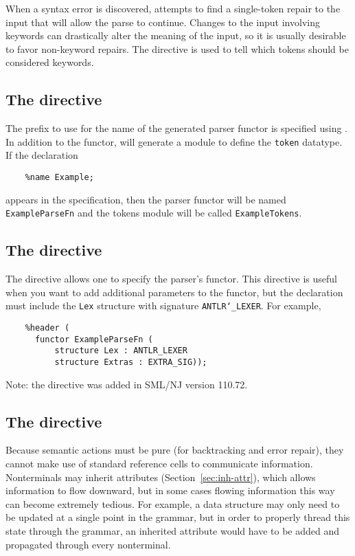 When a syntax error is discovered, \antlr{} attempts to find a single-token repair to the input that will allow the parse to continue.  Changes to the input involving keywords can drastically alter the meaning of the input, so it is usually desirable to favor non-keyword repairs.  The  directive is used to tell \antlr{} which tokens should be considered keywords.

\subsection{The  directive}

The prefix to use for the name of the generated parser functor is specified using .
In addition to the functor, \antlr{} will generate a module to define the {\tt token} datatype.
If the declaration
\begin{verbatim}
    %name Example;
\end{verbatim}
appears in the specification, then the parser functor will be named
\texttt{ExampleParseFn} and the tokens module will be called \texttt{ExampleTokens}.

\subsection{The  directive}
The  directive allows one to specify the parser's functor.
This directive is useful when you want to add additional parameters to the functor,
but the declaration must include the \texttt{Lex} structure with signature
\texttt{ANTLR\char`\_LEXER}.
For example,
\begin{verbatim}
    %header (
      functor ExampleParseFn (
          structure Lex : ANTLR_LEXER
          structure Extras : EXTRA_SIG));
\end{verbatim}%

Note: the  directive was added in SML/NJ version 110.72.

\subsection{The  directive}

Because semantic actions must be pure (for backtracking and error repair), they cannot make use of standard reference cells to communicate information.
Nonterminals may inherit attributes (Section~\ref{sec:inh-attr}), which allows information to flow downward, but in some cases flowing information this way can become extremely tedious.
For example, a data structure may only need to be updated at a single point in the grammar, but in order to properly thread this state through the grammar, an inherited attribute would have to be added and propagated through every nonterminal.


